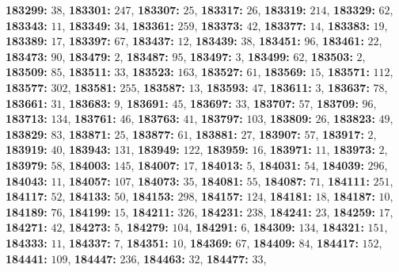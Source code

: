 \textsf{\bfseries 183299:} $38$, \textsf{\bfseries 183301:} $247$, \textsf{\bfseries 183307:} $25$, \textsf{\bfseries 183317:} $26$, \textsf{\bfseries 183319:} $214$, \textsf{\bfseries 183329:} $62$, \textsf{\bfseries 183343:} $11$, \textsf{\bfseries 183349:} $34$, \textsf{\bfseries 183361:} $259$, \textsf{\bfseries 183373:} $42$, \textsf{\bfseries 183377:} $14$, \textsf{\bfseries 183383:} $19$, \textsf{\bfseries 183389:} $17$, \textsf{\bfseries 183397:} $67$, \textsf{\bfseries 183437:} $12$, \textsf{\bfseries 183439:} $38$, \textsf{\bfseries 183451:} $96$, \textsf{\bfseries 183461:} $22$, \textsf{\bfseries 183473:} $90$, \textsf{\bfseries 183479:} $2$, \textsf{\bfseries 183487:} $95$, \textsf{\bfseries 183497:} $3$, \textsf{\bfseries 183499:} $62$, \textsf{\bfseries 183503:} $2$, \textsf{\bfseries 183509:} $85$, \textsf{\bfseries 183511:} $33$, \textsf{\bfseries 183523:} $163$, \textsf{\bfseries 183527:} $61$, \textsf{\bfseries 183569:} $15$, \textsf{\bfseries 183571:} $112$, \textsf{\bfseries 183577:} $302$, \textsf{\bfseries 183581:} $255$, \textsf{\bfseries 183587:} $13$, \textsf{\bfseries 183593:} $47$, \textsf{\bfseries 183611:} $3$, \textsf{\bfseries 183637:} $78$, \textsf{\bfseries 183661:} $31$, \textsf{\bfseries 183683:} $9$, \textsf{\bfseries 183691:} $45$, \textsf{\bfseries 183697:} $33$, \textsf{\bfseries 183707:} $57$, \textsf{\bfseries 183709:} $96$, \textsf{\bfseries 183713:} $134$, \textsf{\bfseries 183761:} $46$, \textsf{\bfseries 183763:} $41$, \textsf{\bfseries 183797:} $103$, \textsf{\bfseries 183809:} $26$, \textsf{\bfseries 183823:} $49$, \textsf{\bfseries 183829:} $83$, \textsf{\bfseries 183871:} $25$, \textsf{\bfseries 183877:} $61$, \textsf{\bfseries 183881:} $27$, \textsf{\bfseries 183907:} $57$, \textsf{\bfseries 183917:} $2$, \textsf{\bfseries 183919:} $40$, \textsf{\bfseries 183943:} $131$, \textsf{\bfseries 183949:} $122$, \textsf{\bfseries 183959:} $16$, \textsf{\bfseries 183971:} $11$, \textsf{\bfseries 183973:} $2$, \textsf{\bfseries 183979:} $58$, \textsf{\bfseries 184003:} $145$, \textsf{\bfseries 184007:} $17$, \textsf{\bfseries 184013:} $5$, \textsf{\bfseries 184031:} $54$, \textsf{\bfseries 184039:} $296$, \textsf{\bfseries 184043:} $11$, \textsf{\bfseries 184057:} $107$, \textsf{\bfseries 184073:} $35$, \textsf{\bfseries 184081:} $55$, \textsf{\bfseries 184087:} $71$, \textsf{\bfseries 184111:} $251$, \textsf{\bfseries 184117:} $52$, \textsf{\bfseries 184133:} $50$, \textsf{\bfseries 184153:} $298$, \textsf{\bfseries 184157:} $124$, \textsf{\bfseries 184181:} $18$, \textsf{\bfseries 184187:} $10$, \textsf{\bfseries 184189:} $76$, \textsf{\bfseries 184199:} $15$, \textsf{\bfseries 184211:} $326$, \textsf{\bfseries 184231:} $238$, \textsf{\bfseries 184241:} $23$, \textsf{\bfseries 184259:} $17$, \textsf{\bfseries 184271:} $42$, \textsf{\bfseries 184273:} $5$, \textsf{\bfseries 184279:} $104$, \textsf{\bfseries 184291:} $6$, \textsf{\bfseries 184309:} $134$, \textsf{\bfseries 184321:} $151$, \textsf{\bfseries 184333:} $11$, \textsf{\bfseries 184337:} $7$, \textsf{\bfseries 184351:} $10$, \textsf{\bfseries 184369:} $67$, \textsf{\bfseries 184409:} $84$, \textsf{\bfseries 184417:} $152$, \textsf{\bfseries 184441:} $109$, \textsf{\bfseries 184447:} $236$, \textsf{\bfseries 184463:} $32$, \textsf{\bfseries 184477:} $33$, 
